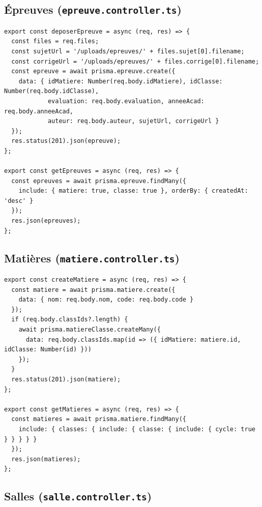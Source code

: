 \documentclass[12pt,a4paper]{article}
\begin{document}
\subsection{Épreuves (\texttt{epreuve.controller.ts})}

\begin{lstlisting}[style=code]
export const deposerEpreuve = async (req, res) => {
  const files = req.files;
  const sujetUrl = '/uploads/epreuves/' + files.sujet[0].filename;
  const corrigeUrl = '/uploads/epreuves/' + files.corrige[0].filename;
  const epreuve = await prisma.epreuve.create({
    data: { idMatiere: Number(req.body.idMatiere), idClasse: Number(req.body.idClasse),
            evaluation: req.body.evaluation, anneeAcad: req.body.anneeAcad,
            auteur: req.body.auteur, sujetUrl, corrigeUrl }
  });
  res.status(201).json(epreuve);
};

export const getEpreuves = async (req, res) => {
  const epreuves = await prisma.epreuve.findMany({
    include: { matiere: true, classe: true }, orderBy: { createdAt: 'desc' }
  });
  res.json(epreuves);
};
\end{lstlisting}

\subsection{Matières (\texttt{matiere.controller.ts})}

\begin{lstlisting}[style=code]
export const createMatiere = async (req, res) => {
  const matiere = await prisma.matiere.create({
    data: { nom: req.body.nom, code: req.body.code }
  });
  if (req.body.classIds?.length) {
    await prisma.matiereClasse.createMany({
      data: req.body.classIds.map(id => ({ idMatiere: matiere.id, idClasse: Number(id) }))
    });
  }
  res.status(201).json(matiere);
};

export const getMatieres = async (req, res) => {
  const matieres = await prisma.matiere.findMany({
    include: { classes: { include: { classe: { include: { cycle: true } } } } }
  });
  res.json(matieres);
};
\end{lstlisting}

\subsection{Salles (\texttt{salle.controller.ts})}
\end{document}
